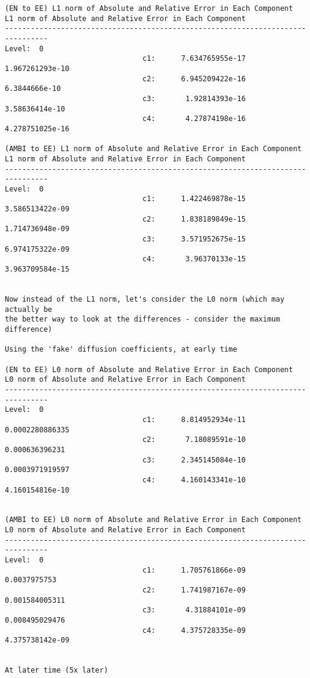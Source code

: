 \documentclass[final]{siamltex}
\begin{document}
\begin{verbatim}
(EN to EE) L1 norm of Absolute and Relative Error in Each Component
L1 norm of Absolute and Relative Error in Each Component
--------------------------------------------------------------------------------
Level:  0
                                c1:      7.634765955e-17     1.967261293e-10
                                c2:      6.945209422e-16       6.3844666e-10
                                c3:       1.92814393e-16      3.58636414e-10
                                c4:       4.27874198e-16     4.278751025e-16

(AMBI to EE) L1 norm of Absolute and Relative Error in Each Component
L1 norm of Absolute and Relative Error in Each Component
--------------------------------------------------------------------------------
Level:  0
                                c1:      1.422469878e-15     3.586513422e-09
                                c2:      1.838189849e-15     1.714736948e-09
                                c3:      3.571952675e-15     6.974175322e-09
                                c4:       3.96370133e-15     3.963709584e-15


Now instead of the L1 norm, let's consider the L0 norm (which may actually be
the better way to look at the differences - consider the maximum difference)

Using the 'fake' diffusion coefficients, at early time

(EN to EE) L0 norm of Absolute and Relative Error in Each Component
L0 norm of Absolute and Relative Error in Each Component
--------------------------------------------------------------------------------
Level:  0
                                c1:      8.814952934e-11     0.0002280886335
                                c2:       7.18089591e-10      0.000636396231
                                c3:      2.345145084e-10     0.0003971919597
                                c4:      4.160143341e-10     4.160154816e-10


(AMBI to EE) L0 norm of Absolute and Relative Error in Each Component
L0 norm of Absolute and Relative Error in Each Component
--------------------------------------------------------------------------------
Level:  0
                                c1:      1.705761866e-09        0.0037975753
                                c2:      1.741987167e-09      0.001584005311
                                c3:       4.31884101e-09      0.008495029476
                                c4:      4.375728335e-09     4.375738142e-09


At later time (5x later)


\end{verbatim}
\end{document}

